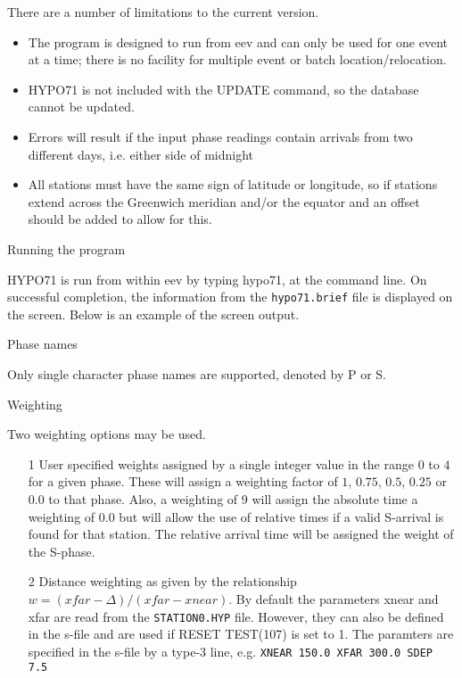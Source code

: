 There are a number of limitations to the current version. 
\begin{itemize}
\item
The program is designed to run from eev and can only be used for one event at a time; there is no facility for multiple event or batch location/relocation. 
\item
HYPO71 is not included with the UPDATE command, so the database cannot be updated. 
\item
Errors will result if the input phase readings contain arrivals from two different days, i.e. either 
side of midnight 
\item
All stations must have the same sign of latitude or longitude, so if stations extend across the Greenwich meridian and/or the equator and an offset should be added to allow for this. 
\end{itemize}

Running the program 

HYPO71 is run from within eev by typing hypo71, at the command line. 
On successful completion, the information from the \texttt{hypo71.brief} 
file is displayed on the screen. Below is an example of the screen output. 



Phase names 

Only single character phase names are supported, denoted by P or S. 

Weighting 

Two weighting options may be used. 
\begin{itemize}
\item[1]
User specified weights assigned by a single integer value in the range 
$0$ to $4$ for a given phase. These will assign a weighting factor of 
$1$, $0.75$, $0.5$, $0.25 $ or  $0.0 $ to that phase. Also, a weighting of 9 will assign the absolute time a weighting of 0.0 but will allow the use of relative times if a valid S-arrival is found for that station. The relative arrival time will be assigned the weight of the S-phase. 
\item[2]
Distance weighting as given by the relationship 
$w = (xfar - \Delta ) / (xfar -xnear)$. 
By default the parameters xnear and xfar are read from the \texttt{STATION0.HYP} file. 
However, they can also 
be defined in the s-file and are used if RESET TEST(107) is set to 1. The paramters
are specified in the s-file by a type-3 line, e.g.\newline
\texttt{XNEAR  150.0 XFAR  300.0 SDEP    7.5 }
\end{itemize}


